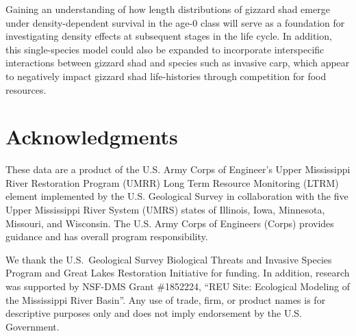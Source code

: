 \documentclass[preprint,review,12pt,authoryear]{elsarticle}
\begin{document}
Gaining an understanding of how length distributions of gizzard shad emerge under density-dependent survival in the age-0 class will serve as a foundation for investigating density effects at subsequent stages in the life cycle.  
In addition, this single-species model could also be expanded to incorporate interspecific interactions between gizzard shad and species such as invasive carp, which appear to negatively impact gizzard shad life-histories through competition for food resources.   

\section{Acknowledgments}

These data are a product of the U.S. Army Corps of Engineer's Upper Mississippi River Restoration Program (UMRR) Long Term Resource Monitoring (LTRM) element implemented by the U.S. Geological Survey in collaboration with the five Upper Mississippi River System (UMRS) states of Illinois, Iowa, Minnesota, Missouri, and Wisconsin.
The U.S. Army Corps of Engineers (Corps) provides guidance and has overall program responsibility.

We thank the U.S.~Geological Survey  Biological Threats and Invasive Species Program and Great Lakes Restoration Initiative for funding.
In addition, research was supported by NSF-DMS Grant \#1852224, ``REU Site: Ecological Modeling of the Mississippi River Basin''. Any use of trade, firm, or product names is for descriptive purposes only and does not imply endorsement by the U.S. Government.

  
 
\end{document}
